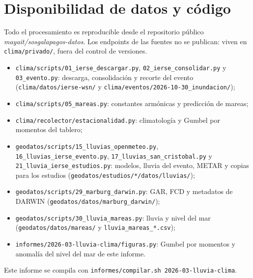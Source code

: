 \documentclass{sosg-informe}
\begin{document}
\section*{Disponibilidad de datos y código}
{\small Todo el procesamiento es reproducible desde el repositorio público \emph{mayait/sosgalapagos-datos}. Los endpoints de las fuentes no se publican: viven en \texttt{clima/privado/}, fuera del control de versiones.
\begin{itemize}
  \item \texttt{clima/scripts/01\_ierse\_descargar.py}, \texttt{02\_ierse\_consolidar.py} y \texttt{03\_evento.py}: descarga, consolidación y recorte del evento (\texttt{clima/datos/ierse-wsn/} y \texttt{clima/eventos/2026-10-30\_inundacion/});
  \item \texttt{clima/scripts/05\_mareas.py}: constantes armónicas y predicción de mareas;
  \item \texttt{clima/recolector/estacionalidad.py}: climatología y Gumbel por momentos del tablero;
  \item \texttt{geodatos/scripts/15\_lluvias\_openmeteo.py}, \texttt{16\_lluvias\_ierse\_evento.py}, \texttt{17\_lluvias\_san\_cristobal.py} y \texttt{21\_lluvia\_ierse\_estudios.py}: modelos, lluvia del evento, METAR y copias para los estudios (\texttt{geodatos/estudios/*/datos/lluvias/});
  \item \texttt{geodatos/scripts/29\_marburg\_darwin.py}: GAR, FCD y metadatos de DARWIN (\texttt{geodatos/datos/marburg\_darwin/});
  \item \texttt{geodatos/scripts/30\_lluvia\_mareas.py}: lluvia y nivel del mar (\texttt{geodatos/datos/mareas/} y \texttt{lluvia\_mareas\_*.csv});
  \item \texttt{informes/2026-03-lluvia-clima/figuras.py}: Gumbel por momentos y anomalía del nivel del mar de este informe.
\end{itemize}
Este informe se compila con \texttt{informes/compilar.sh 2026-03-lluvia-clima}.\par}



\end{document}
